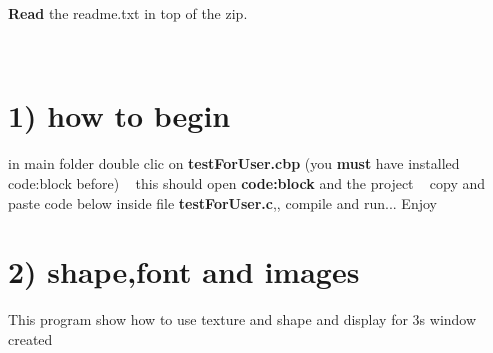 {\bfseries Read} the readme.\+txt in top of the zip.

~\newline
\hypertarget{index_begin}{}\section{1) how to begin}\label{index_begin}
in main folder double clic on {\bfseries test\+For\+User.\+cbp} (you {\bfseries must} have installed code\+:block before) ~\newline
 this should open {\bfseries code\+:block} and the project ~\newline
 copy and paste code below inside file {\bfseries test\+For\+User.\+c},, compile and run... Enjoy \hypertarget{index_first}{}\section{2) shape,font and images}\label{index_first}
This program show how to use texture and shape and display for 3s window created ~\newline
 
